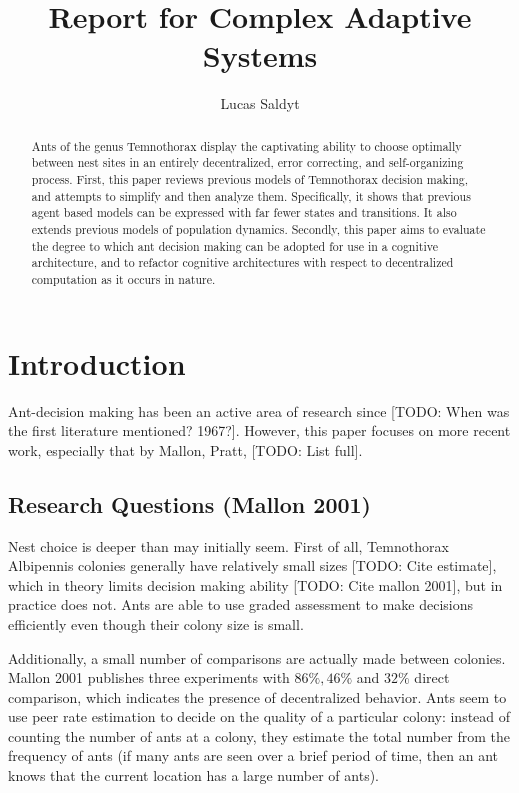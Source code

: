 \documentclass[letterpaper]{article}
\title{Report for Complex Adaptive Systems}
\author{Lucas Saldyt}
\begin{document}
\maketitle

\begin{abstract}
    Ants of the genus Temnothorax display the captivating ability to choose optimally between nest sites in an entirely decentralized, error correcting, and self-organizing process.
    First, this paper reviews previous models of Temnothorax decision making, and attempts to simplify and then analyze them.
    Specifically, it shows that previous agent based models can be expressed with far fewer states and transitions. 
    It also extends previous models of population dynamics.
    Secondly, this paper aims to evaluate the degree to which ant decision making can be adopted for use in a cognitive architecture, and to refactor cognitive architectures with respect to decentralized computation as it occurs in nature.
\end{abstract}

\section{Introduction}
Ant-decision making has been an active area of research since [TODO: When was the first literature mentioned? 1967?]. 
However, this paper focuses on more recent work, especially that by Mallon, Pratt, [TODO: List full].

\subsection{Research Questions (Mallon 2001)}

Nest choice is deeper than may initially seem.
First of all, Temnothorax Albipennis colonies generally have relatively small sizes [TODO: Cite estimate], which in theory limits decision making ability [TODO: Cite mallon 2001], but in practice does not. 
Ants are able to use graded assessment to make decisions efficiently even though their colony size is small.

Additionally, a small number of comparisons are actually made between colonies. 
Mallon 2001 publishes three experiments with $86\%, 46\%$ and $32\%$ direct comparison, which indicates the presence of decentralized behavior.
Ants seem to use peer rate estimation to decide on the quality of a particular colony: instead of counting the number of ants at a colony, they estimate the total number from the frequency of ants (if many ants are seen over a brief period of time, then an ant knows that the current location has a large number of ants).
\end{document}
